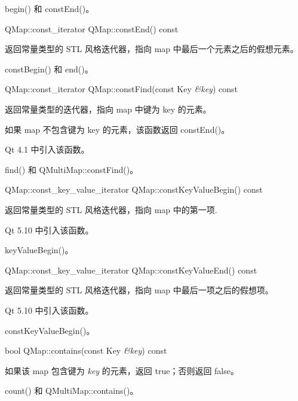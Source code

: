 \begin{notice}[另请参阅]
begin() 和 constEnd()。
\end{notice}

\splitLine

QMap::const\_iterator QMap::constEnd() const

返回常量类型的 STL 风格迭代器，指向 map 中最后一个元素之后的假想元素。

\begin{notice}[另请参阅]
constBegin() 和 end()。
\end{notice}

\splitLine

QMap::const\_iterator QMap::constFind(const Key \emph{\&key}) const

返回常量类型的迭代器，指向 map 中键为 key 的元素。

如果 map 不包含键为 key 的元素，该函数返回 constEnd()。

Qt 4.1 中引入该函数。

\begin{notice}[另请参阅]
find() 和 QMultiMap::constFind()。
\end{notice}

\splitLine

QMap::const\_key\_value\_iterator QMap::constKeyValueBegin() const

返回常量类型的 STL 风格迭代器，指向 map 中的第一项.

Qt 5.10 中引入该函数。

\begin{notice}[另请参阅]
keyValueBegin()。
\end{notice}

\splitLine

QMap::const\_key\_value\_iterator QMap::constKeyValueEnd() const

返回常量类型的 STL 风格迭代器，指向 map 中最后一项之后的假想项。

Qt 5.10 中引入该函数。

\begin{notice}[另请参阅]
constKeyValueBegin()。
\end{notice}

\splitLine

bool QMap::contains(const Key \emph{\&key}) const

如果该 map 包含键为 \emph{key} 的元素，返回 true；否则返回 false。

\begin{notice}[另请参阅]
count() 和 QMultiMap::contains()。
\end{notice}

